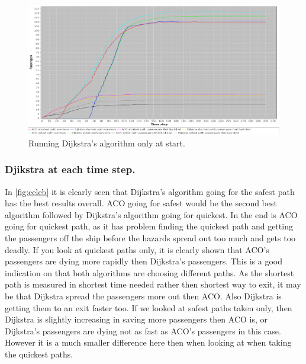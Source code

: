 \begin{figure} [float]
\centering
\hspace*{-1.0in}
\includegraphics[scale=0.35]{images/Graph-using-1000-rounds-140-passangers-and-one-fire-dijkstra-one-time.png}
\caption{Running Dijkstra's algorithm only at start.}
\label{fig:celebDF}
\end{figure}

\subsubsection{Djikstra at each time step.}
In \ref{fig:celeb} it is clearly seen that Dijkstra's algorithm going for the safest path has the best results overall. ACO going for safest would be the second best algorithm followed by Dijkstra's algorithm going for quickest. In the end is ACO going for quickest path, as it has problem finding the quickest path and getting the passengers off the ship before the hazards spread out too much and gets too deadly.
If you look at quickest paths only, it is clearly shown that ACO's passengers are dying more rapidly then Dijkstra's passengers. This is a good indication on that both algorithms are choosing different paths. As the shortest path is measured in shortest time needed rather then shortest way to exit, it may be that Dijkstra spread the passengers more out then ACO. Also Dijkstra is getting them to an exit faster too.
If we looked at safest paths taken only, then Dijkstra is slightly increasing in saving more passengers then ACO is, or Dijkstra's passengers are dying not as fast as ACO's passengers in this case. However it is a much smaller difference here then when looking at when taking the quickest paths.




